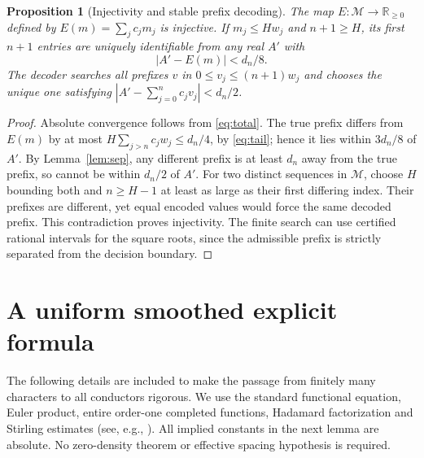 \documentclass[11pt]{article}
\newtheorem{proposition}[theorem]{Proposition}
\theoremstyle{remark}\newtheorem{remark}[theorem]{Remark}
\newcommand{\R}{\mathbb R}\newcommand{\C}{\mathbb C}\newcommand{\N}{\mathbb N}\newcommand{\Z}{\mathbb Z}\newcommand{\Q}{\mathbb Q}
\begin{document}
\begin{proposition}[Injectivity and stable prefix decoding]\label{prop:code}
The map $E:\mathcal M\to\R_{\ge0}$ defined by $E(m)=\sum_j c_j m_j$ is injective. If $m_j\le H w_j$ and $n+1\ge H$, its first $n+1$ entries are uniquely identifiable from any real $A'$ with
\[
|A'-E(m)|<d_n/8.
\]
The decoder searches all prefixes $v$ in $0\le v_j\le(n+1)w_j$ and chooses the unique one satisfying $|A'-\sum_{j=0}^n c_j v_j|<d_n/2$.
\end{proposition}
\begin{proof}
Absolute convergence follows from \eqref{eq:total}. The true prefix differs from $E(m)$ by at most $H\sum_{j>n}c_j w_j\le d_n/4$, by \eqref{eq:tail}; hence it lies within $3d_n/8$ of $A'$. By Lemma~\ref{lem:sep}, any different prefix is at least $d_n$ away from the true prefix, so cannot be within $d_n/2$ of $A'$. For two distinct sequences in $\mathcal M$, choose $H$ bounding both and $n\ge H-1$ at least as large as their first differing index. Their prefixes are different, yet equal encoded values would force the same decoded prefix. This contradiction proves injectivity. The finite search can use certified rational intervals for the square roots, since the admissible prefix is strictly separated from the decision boundary.
\end{proof}

\section{A uniform smoothed explicit formula}
The following details are included to make the passage from finitely many characters to all conductors rigorous. We use the standard functional equation, Euler product, entire order-one completed functions, Hadamard factorization and Stirling estimates (see, e.g., \cite{mv,dav}). All implied constants in the next lemma are absolute. No zero-density theorem or effective spacing hypothesis is required.
\end{document}
